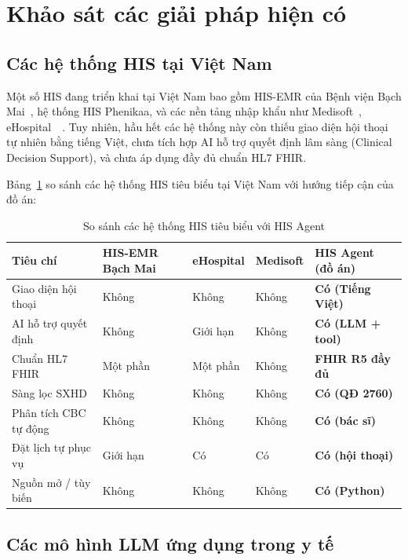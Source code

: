 \documentclass[a4paper,13pt,3p,twoside,openany]{report}
\theoremstyle{definition}
\theoremstyle{remark}
\theoremstyle{definition}
\let\ORIGsection\section
\let\ORIGsubsection\subsection
\renewcommand{\section}{\needspace{3\baselineskip}\ORIGsection}
\renewcommand{\subsection}{\needspace{3\baselineskip}\ORIGsubsection}
\begin{document}
\section{Khảo sát các giải pháp hiện có}

\subsection{Các hệ thống HIS tại Việt Nam}

Một số HIS đang triển khai tại Việt Nam bao gồm HIS-EMR của Bệnh viện Bạch Mai~\cite{his-bachmai}, hệ thống HIS Phenikaa, và các nền tảng nhập khẩu như Medisoft~\cite{medisoft}, eHospital~\cite{ehospital}~\cite{his-vn}. Tuy nhiên, hầu hết các hệ thống này còn thiếu giao diện hội thoại tự nhiên bằng tiếng Việt, chưa tích hợp AI hỗ trợ quyết định lâm sàng (Clinical Decision Support), và chưa áp dụng đầy đủ chuẩn HL7 FHIR.

Bảng~\ref{tab:his-compare} so sánh các hệ thống HIS tiêu biểu tại Việt Nam với hướng tiếp cận của đồ án:

\begin{table}[H]
\centering
\begin{tabular}{|p{3.2cm}|p{2.2cm}|p{2.2cm}|p{2.2cm}|p{2.2cm}|}
\hline
\textbf{Tiêu chí} & \textbf{HIS-EMR Bạch Mai} & \textbf{eHospital} & \textbf{Medisoft} & \textbf{HIS Agent (đồ án)} \\
\hline
Giao diện hội thoại & Không & Không & Không & \textbf{Có (Tiếng Việt)} \\
\hline
AI hỗ trợ quyết định & Không & Giới hạn & Không & \textbf{Có (LLM + tool)} \\
\hline
Chuẩn HL7 FHIR & Một phần & Một phần & Không & \textbf{FHIR R5 đầy đủ} \\
\hline
Sàng lọc SXHD & Không & Không & Không & \textbf{Có (QĐ 2760)} \\
\hline
Phân tích CBC tự động & Không & Không & Không & \textbf{Có (bác sĩ)} \\
\hline
Đặt lịch tự phục vụ & Giới hạn & Có & Có & \textbf{Có (hội thoại)} \\
\hline
Nguồn mở / tùy biến & Không & Không & Không & \textbf{Có (Python)} \\
\hline
\end{tabular}
\caption{So sánh các hệ thống HIS tiêu biểu với HIS Agent}
\label{tab:his-compare}
\end{table}

\subsection{Các mô hình LLM ứng dụng trong y tế}
\end{document}

